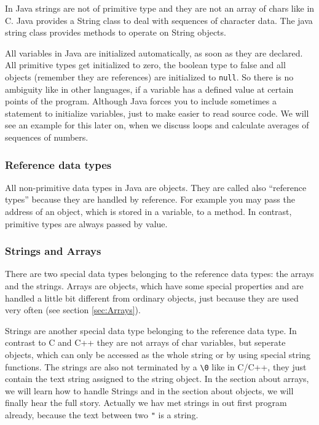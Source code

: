 In Java strings are not of primitive type and they are not an
array of chars like in C. Java provides a String
class to deal with sequences of character data. The java string
class provides methods to operate on String objects.

All variables in Java are initialized automatically, as soon as they
are declared. All primitive types get initialized to zero, the boolean type
to false and all objects (remember they are references) are initialized
to \verb|null|. So there is no ambiguity like in other languages, if
a variable has a defined value at certain points of the program. 
Although Java forces you to include sometimes a statement to
initialize variables, just to make easier to read source code.
We will see an example for this later on, when we discuss loops
and calculate averages of sequences of numbers.

\subsubsection{Reference data types}
\label{sec:Reference_data_types}

All non-primitive data types in Java are objects. They are
called also ``reference types'' because they are handled by
reference. For example you may pass the address of an object, which is
stored in a variable, to a method. In contrast, primitive types are
always passed by value.

\subsubsection{Strings and Arrays}
There are two special data types belonging to the reference data types:
the arrays and the strings. Arrays are objects, which have some
special properties and are handled a little bit different from
ordinary objects, just because they are used very often (see section
\ref{sec:Arrays}).

Strings are another special data type belonging to the reference data 
type. In contrast to C and C++ they are not arrays of char variables,
but seperate objects, which can only be accessed as the whole string or
by using special string functions. The strings are also not terminated
by a \verb|\0| like in C/C++, they just contain the text string
assigned to the string object. In the section about arrays, we will learn
how to handle Strings and in the section about objects, we will finally
hear the full story. Actually we hav met strings in out first program
already, because the text between two \verb|"| is a string.


